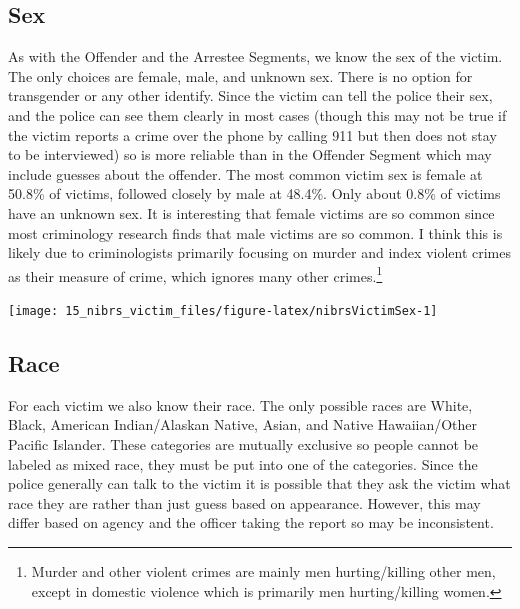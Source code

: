 \documentclass[
]{krantz}
\let\origfigure\figure
\let\endorigfigure\endfigure
\renewenvironment{figure}[1][2] {
    \expandafter\origfigure\expandafter[H]
} {
    \endorigfigure
}
\begin{document}
\subsection{Sex}\label{sex-2}

As with the Offender and the Arrestee Segments, we know the
sex of the victim. The only choices are female, male, and
unknown sex. There is no option for transgender or any other
identify. Since the victim can tell the police their sex,
and the police can see them clearly in most cases (though
this may not be true if the victim reports a crime over the
phone by calling 911 but then does not stay to be
interviewed) so is more reliable than in the Offender
Segment which may include guesses about the offender. The
most common victim sex is female at 50.8\% of victims,
followed closely by male at 48.4\%. Only about 0.8\% of
victims have an unknown sex. It is interesting that female
victims are so common since most criminology research finds
that male victims are so common. I think this is likely due
to criminologists primarily focusing on murder and index
violent crimes as their measure of crime, which ignores many
other crimes.\footnote{Murder and other violent crimes are
  mainly men hurting/killing other men, except in domestic
  violence which is primarily men hurting/killing women.}

\begin{figure}

{\centering \texttt{[image: 15\_nibrs\_victim\_files/figure-latex/nibrsVictimSex-1]} 

}

\caption{The share of victims by sex, 1991-2022.}\label{fig:nibrsVictimSex}
\end{figure}

\subsection{Race}\label{race-3}

For each victim we also know their race. The only possible
races are White, Black, American Indian/Alaskan Native,
Asian, and Native Hawaiian/Other Pacific Islander. These
categories are mutually exclusive so people cannot be
labeled as mixed race, they must be put into one of the
categories. Since the police generally can talk to the
victim it is possible that they ask the victim what race
they are rather than just guess based on appearance.
However, this may differ based on agency and the officer
taking the report so may be inconsistent.
\end{document}
